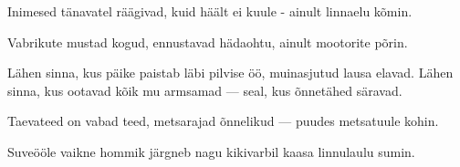 Inimesed t\"anavatel
r\"a\"agivad, kuid h\"a\"alt ei kuule -
ainult linnaelu k\~omin.

Vabrikute mustad kogud,
ennustavad h\"adaohtu,
ainult mootorite p\~orin.

L\"ahen sinna, kus p\"aike paistab
l\"abi pilvise \"o\"o,
muinasjutud lausa elavad.
L\"ahen sinna, kus ootavad
k\~oik mu armsamad ---
seal, kus \~onnet\"ahed s\"aravad.

Taevateed on vabad teed,
metsarajad \~onnelikud ---
puudes metsatuule kohin.

Suve\"o\"ole vaikne hommik
j\"argneb nagu kikivarbil
kaasa linnulaulu sumin.